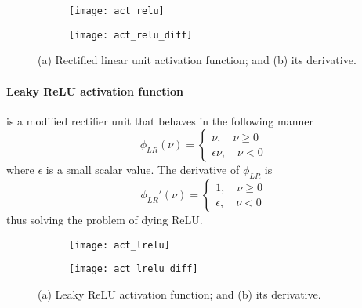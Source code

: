 \begin{figure}
	\centering
	\begin{subfigure}{0.45\textwidth}
		\texttt{[image: act\_relu]}
		\caption{}
	\end{subfigure}
	\begin{subfigure}{0.45\textwidth}
		\texttt{[image: act\_relu\_diff]}
		\caption{}
	\end{subfigure}
	\caption{(a) Rectified linear unit activation function; and (b) its derivative.}
\end{figure}

\paragraph*{Leaky ReLU activation function} is a modified rectifier unit that behaves in the following manner
\begin{equation}\label{app-act-7}
\phi_{LR}(\nu)=
\begin{cases}
\nu,\quad \nu\ge0\\
\epsilon\nu,\quad \nu<0
\end{cases}
\end{equation}
where $ \epsilon $ is a small scalar value. The derivative of $ \phi_{LR} $ is
\begin{equation}\label{app-act-7-1}
\phi_{LR}'(\nu)=
\begin{cases}
1,\quad \nu\ge0\\
\epsilon,\quad \nu<0
\end{cases}
\end{equation}
thus solving the problem of dying ReLU.

\begin{figure}
	\centering
	\begin{subfigure}{0.45\textwidth}
		\texttt{[image: act\_lrelu]}
		\caption{}
	\end{subfigure}
	\begin{subfigure}{0.45\textwidth}
		\texttt{[image: act\_lrelu\_diff]}
		\caption{}
	\end{subfigure}
	\caption{(a) Leaky ReLU activation function; and (b) its derivative.}
\end{figure}


